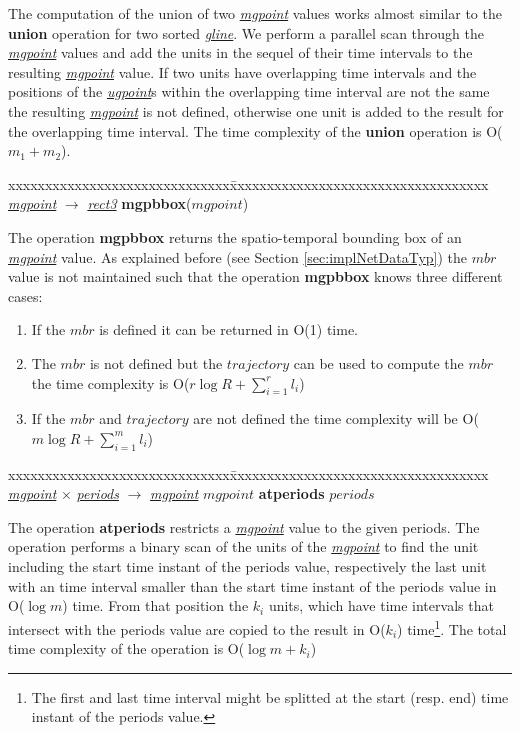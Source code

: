 \documentclass[a4paper]{article}
\newcommand{\op}[1]{\textbf{#1}}
\newcommand{\dt}[1]{\textsl{\underline{#1}}}
\begin{document}
The computation of the union of two \dt{mgpoint} values works almost similar to
the \op{union} operation for two sorted \dt{gline}. We perform a parallel scan
through the \dt{mgpoint} values and add the units in the sequel of their time
intervals to the resulting \dt{mgpoint} value. If two units have overlapping time
intervals and the positions of the \dt{ugpoint}s within the overlapping time
interval are not the same the resulting \dt{mgpoint} is not defined, otherwise
one unit is added to the result for the overlapping time interval. The time
complexity of the \op{union} operation is O($m_1 + m_2$).
\begin{tabbing}
xxxxxxxxxxxxxxxxxxxxxxxxxxxxxx\=xxxxxxxxxxxxxxxxxxxxxxxxxxxxxxxxxxx\kill
\dt{mgpoint} $\rightarrow$ \dt{rect3} \> \op{mgpbbox}($mgpoint$)\\
\end{tabbing}
The operation \op{mgpbbox} returns the spatio-temporal bounding box of an
\dt{mgpoint} value. As explained before (see Section \ref{sec:implNetDataTyp})
the $mbr$ value is not maintained such that the operation \op{mgpbbox} knows
three different cases:
\begin{enumerate}
  \item If the $mbr$ is defined it can be returned in O(1) time.
  \item The $mbr$ is not defined but the $trajectory$ can be used to compute the
$mbr$ the time complexity is O($r \log {R} + \sum_{i=1}^{r}{l_i}$)
  \item If the $mbr$ and $trajectory$ are not defined the time complexity will be
O($m \log {R} + \sum_{i=1}^{m}{l_i}$)
\end{enumerate}
\begin{tabbing}
xxxxxxxxxxxxxxxxxxxxxxxxxxxxxx\=xxxxxxxxxxxxxxxxxxxxxxxxxxxxxxxxxxx\kill
\dt{mgpoint} $\times$ \dt{periods} $\rightarrow$ \dt{mgpoint} \> $mgpoint$ \op{atperiods} $periods$\\
\end{tabbing}
The operation \op{atperiods} restricts a \dt{mgpoint} value to the given
periods. The operation performs a binary scan of the units of the \dt{mgpoint}
to find the unit including the start time instant of the periods value,
respectively the last unit with an time interval smaller than the start time
instant of the periods value in O($\log m$) time. From that position the $k_i$
units, which have time intervals that intersect with the periods value are
copied to the result in O($k_i$) time\footnote{The first and last time
interval might be splitted at the start (resp. end) time instant of the periods
value.}. The total time complexity of the operation is O($\log {m} + k_i$)
\end{document}
